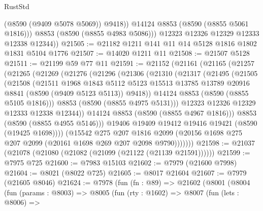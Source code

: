 \begin{lexlean}{RustStd}
\begin{coremodule}
                (@8590 (@9409 @5078 @5069))
                @9418))
            @14124
            @8853
            (@8590 (@8855 @5061 @1816)))
          @8853
          (@8590 (@8855 @4983 @5086)))
        @12323
        @12326
        @12329
        @12333
        @12338
        @12344))
@21505 := @21182 @1211 @141 @11 @14 @5128 @1816 @1802 @1831 @5104 @1776
@21507 := @14020 @1211 @11
@21508 := @21507 @5128
@21511 := @21199 @59 @77 @11
@21591 := @21152
    (@21161
      (@21165
        (@21257
          (@21265
            (@21269
              (@21276
                (@21296
                  (@21306
                    (@21310
                      (@21317
                        (@21495
                          (@21505
                            (@21508
                              (@21511
                                @1968
                                @1843
                                @5112
                                @5123
                                @15513
                                @13785
                                @13789
                                @20916
                                @8841
                                (@8590 (@9409 @5123 @5113))
                                @9418))
                            @14124
                            @8853
                            (@8590 (@8855 @5105 @1816)))
                          @8853
                          (@8590 (@8855 @4975 @5131)))
                        @12323
                        @12326
                        @12329
                        @12333
                        @12338
                        @12344))
                    @14124
                    @8853
                    (@8590 (@8855 @4967 @1816)))
                  @8853
                  (@8590 (@8855 @4955 @5146)))
                @19406
                @19409
                @19412
                @19416
                @19421
                (@8590 (@19425 @1698))))
            (@15542
              @275
              @207
              @1816
              @2099
              (@20156 @1698 @275 @207 @2099 (@20161 @1698 @269 @207 @2098 @9790)))))))
@21598 := @21037 (@21078 (@21080 (@21082 (@21099 (@21122 (@21139 @21591))))))
@21599 := @7975 @725
@21600 := @7983 @15103
@21602 := @7979 (@21600 @7998)
@21604 := @8021 (@8022 @725)
@21605 := @8017 @21604
@21607 := @7979 (@21605 @8046)
@21624 := @7978
    (fun (fn : @89) =>
    @21602
      (@8001
        (@8004
          (fun (params : @8003) =>
          @8005
            (fun (rty : @1602) =>
            @8007
              (fun (lets : @8006) =>

\end{coremodule}
\end{lexlean}
